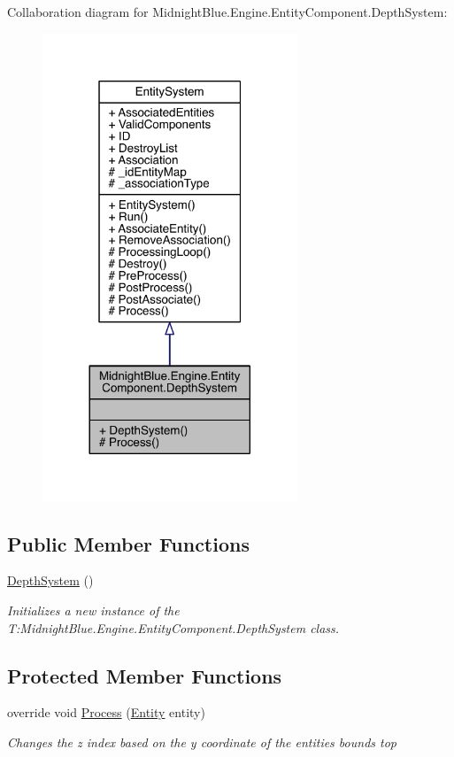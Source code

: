 Collaboration diagram for Midnight\+Blue.\+Engine.\+Entity\+Component.\+Depth\+System\+:
\nopagebreak
\begin{figure}[H]
\begin{center}
\leavevmode
\includegraphics[width=216pt]{class_midnight_blue_1_1_engine_1_1_entity_component_1_1_depth_system__coll__graph}
\end{center}
\end{figure}
\subsection*{Public Member Functions}
\begin{DoxyCompactItemize}
\item 
\hyperlink{class_midnight_blue_1_1_engine_1_1_entity_component_1_1_depth_system_a6cab13c32cca4dcaa8a73fa18c4d84f1}{Depth\+System} ()
\begin{DoxyCompactList}\small\item\em Initializes a new instance of the T\+:\+Midnight\+Blue.\+Engine.\+Entity\+Component.\+Depth\+System class. \end{DoxyCompactList}\end{DoxyCompactItemize}
\subsection*{Protected Member Functions}
\begin{DoxyCompactItemize}
\item 
override void \hyperlink{class_midnight_blue_1_1_engine_1_1_entity_component_1_1_depth_system_a5351ff290c847e93fb96dac6cc43719d}{Process} (\hyperlink{class_midnight_blue_1_1_engine_1_1_entity_component_1_1_entity}{Entity} entity)
\begin{DoxyCompactList}\small\item\em Changes the z index based on the y coordinate of the entities bounds top \end{DoxyCompactList}\end{DoxyCompactItemize}
